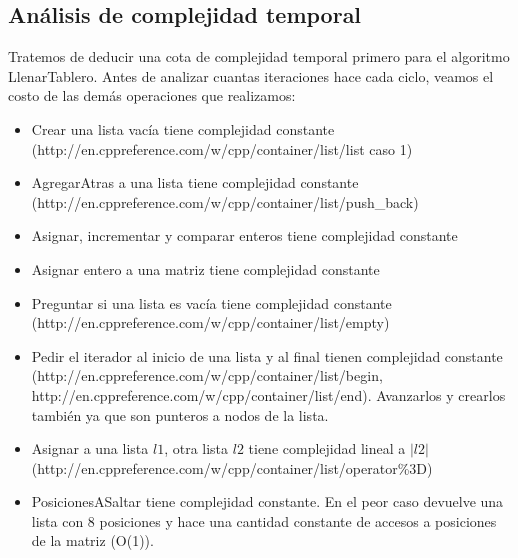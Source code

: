\documentclass[a4paper]{article}
\begin{document}
\subsection{Análisis de complejidad temporal}
Tratemos de deducir una cota de complejidad temporal primero para el algoritmo LlenarTablero.
\newline Antes de analizar cuantas iteraciones hace cada ciclo, veamos el costo de las demás operaciones que realizamos:
\begin{itemize}
\item Crear una lista vacía tiene complejidad constante \newline (http://en.cppreference.com/w/cpp/container/list/list caso 1)
\item AgregarAtras a una lista tiene complejidad constante 
\newline (http://en.cppreference.com/w/cpp/container/list/push\_back)
\item Asignar, incrementar y comparar enteros tiene complejidad constante
\item Asignar entero a una matriz tiene complejidad constante
\item Preguntar si una lista es vacía tiene complejidad constante \newline (http://en.cppreference.com/w/cpp/container/list/empty)
\item Pedir el iterador al inicio de una lista y al final tienen complejidad constante \newline (http://en.cppreference.com/w/cpp/container/list/begin, http://en.cppreference.com/w/cpp/container/list/end). Avanzarlos y crearlos también ya que son punteros a nodos de la lista. 
\item Asignar a una lista $l1$, otra lista $l2$ tiene complejidad lineal a $|l2|$ \newline (http://en.cppreference.com/w/cpp/container/list/operator\%3D)
\item PosicionesASaltar tiene complejidad constante. En el peor caso devuelve una lista con 8 posiciones y hace una cantidad constante de accesos a posiciones de la matriz (O(1)).
\end{itemize}
\end{document}

